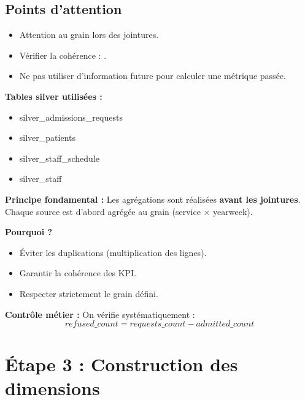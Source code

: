 \documentclass[11pt,a4paper]{article}
\begin{document}
\subsection*{Points d’attention}

\begin{itemize}
  \item Attention au grain lors des jointures.
  \item Vérifier la cohérence : 
  .
  \item Ne pas utiliser d’information future pour calculer une métrique passée.
\end{itemize}

\begin{tcolorbox}[title=\textbf{Gestion du grain et des jointures :}, colback=gray!5, colframe=black, boxrule=0.8pt, arc=2mm]

\textbf{Tables silver utilisées :}
\begin{itemize}
\item silver\_admissions\_requests
\item silver\_patients
\item silver\_staff\_schedule
\item silver\_staff
\end{itemize}

\textbf{Principe fondamental :}
Les agrégations sont réalisées \textbf{avant les jointures}.  
Chaque source est d’abord agrégée au grain (service × yearweek).

\textbf{Pourquoi ?}
\begin{itemize}
\item Éviter les duplications (multiplication des lignes).
\item Garantir la cohérence des KPI.
\item Respecter strictement le grain défini.
\end{itemize}

\textbf{Contrôle métier :}
On vérifie systématiquement :
\[
refused\_count = requests\_count - admitted\_count
\]

\end{tcolorbox}


\section{Étape 3 : Construction des dimensions}
\end{document}
